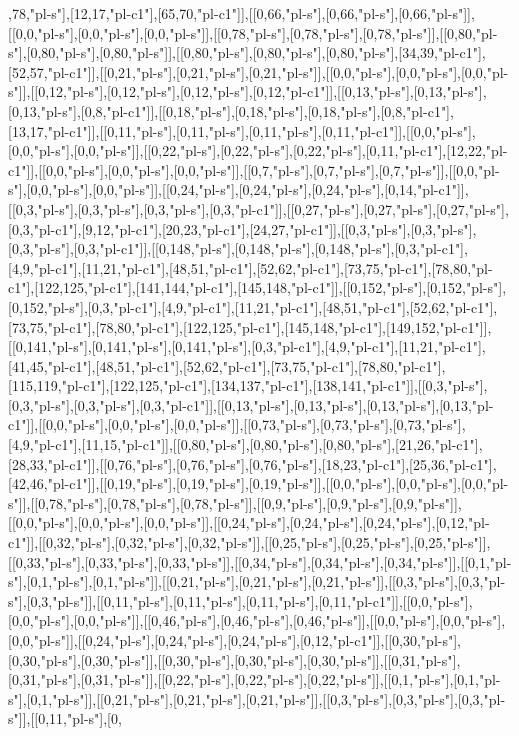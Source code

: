 ,78,"pl-s"],[12,17,"pl-c1"],[65,70,"pl-c1"]],[[0,66,"pl-s"],[0,66,"pl-s"],[0,66,"pl-s"]],[[0,0,"pl-s"],[0,0,"pl-s"],[0,0,"pl-s"]],[[0,78,"pl-s"],[0,78,"pl-s"],[0,78,"pl-s"]],[[0,80,"pl-s"],[0,80,"pl-s"],[0,80,"pl-s"]],[[0,80,"pl-s"],[0,80,"pl-s"],[0,80,"pl-s"],[34,39,"pl-c1"],[52,57,"pl-c1"]],[[0,21,"pl-s"],[0,21,"pl-s"],[0,21,"pl-s"]],[[0,0,"pl-s"],[0,0,"pl-s"],[0,0,"pl-s"]],[[0,12,"pl-s"],[0,12,"pl-s"],[0,12,"pl-s"],[0,12,"pl-c1"]],[[0,13,"pl-s"],[0,13,"pl-s"],[0,13,"pl-s"],[0,8,"pl-c1"]],[[0,18,"pl-s"],[0,18,"pl-s"],[0,18,"pl-s"],[0,8,"pl-c1"],[13,17,"pl-c1"]],[[0,11,"pl-s"],[0,11,"pl-s"],[0,11,"pl-s"],[0,11,"pl-c1"]],[[0,0,"pl-s"],[0,0,"pl-s"],[0,0,"pl-s"]],[[0,22,"pl-s"],[0,22,"pl-s"],[0,22,"pl-s"],[0,11,"pl-c1"],[12,22,"pl-c1"]],[[0,0,"pl-s"],[0,0,"pl-s"],[0,0,"pl-s"]],[[0,7,"pl-s"],[0,7,"pl-s"],[0,7,"pl-s"]],[[0,0,"pl-s"],[0,0,"pl-s"],[0,0,"pl-s"]],[[0,24,"pl-s"],[0,24,"pl-s"],[0,24,"pl-s"],[0,14,"pl-c1"]],[[0,3,"pl-s"],[0,3,"pl-s"],[0,3,"pl-s"],[0,3,"pl-c1"]],[[0,27,"pl-s"],[0,27,"pl-s"],[0,27,"pl-s"],[0,3,"pl-c1"],[9,12,"pl-c1"],[20,23,"pl-c1"],[24,27,"pl-c1"]],[[0,3,"pl-s"],[0,3,"pl-s"],[0,3,"pl-s"],[0,3,"pl-c1"]],[[0,148,"pl-s"],[0,148,"pl-s"],[0,148,"pl-s"],[0,3,"pl-c1"],[4,9,"pl-c1"],[11,21,"pl-c1"],[48,51,"pl-c1"],[52,62,"pl-c1"],[73,75,"pl-c1"],[78,80,"pl-c1"],[122,125,"pl-c1"],[141,144,"pl-c1"],[145,148,"pl-c1"]],[[0,152,"pl-s"],[0,152,"pl-s"],[0,152,"pl-s"],[0,3,"pl-c1"],[4,9,"pl-c1"],[11,21,"pl-c1"],[48,51,"pl-c1"],[52,62,"pl-c1"],[73,75,"pl-c1"],[78,80,"pl-c1"],[122,125,"pl-c1"],[145,148,"pl-c1"],[149,152,"pl-c1"]],[[0,141,"pl-s"],[0,141,"pl-s"],[0,141,"pl-s"],[0,3,"pl-c1"],[4,9,"pl-c1"],[11,21,"pl-c1"],[41,45,"pl-c1"],[48,51,"pl-c1"],[52,62,"pl-c1"],[73,75,"pl-c1"],[78,80,"pl-c1"],[115,119,"pl-c1"],[122,125,"pl-c1"],[134,137,"pl-c1"],[138,141,"pl-c1"]],[[0,3,"pl-s"],[0,3,"pl-s"],[0,3,"pl-s"],[0,3,"pl-c1"]],[[0,13,"pl-s"],[0,13,"pl-s"],[0,13,"pl-s"],[0,13,"pl-c1"]],[[0,0,"pl-s"],[0,0,"pl-s"],[0,0,"pl-s"]],[[0,73,"pl-s"],[0,73,"pl-s"],[0,73,"pl-s"],[4,9,"pl-c1"],[11,15,"pl-c1"]],[[0,80,"pl-s"],[0,80,"pl-s"],[0,80,"pl-s"],[21,26,"pl-c1"],[28,33,"pl-c1"]],[[0,76,"pl-s"],[0,76,"pl-s"],[0,76,"pl-s"],[18,23,"pl-c1"],[25,36,"pl-c1"],[42,46,"pl-c1"]],[[0,19,"pl-s"],[0,19,"pl-s"],[0,19,"pl-s"]],[[0,0,"pl-s"],[0,0,"pl-s"],[0,0,"pl-s"]],[[0,78,"pl-s"],[0,78,"pl-s"],[0,78,"pl-s"]],[[0,9,"pl-s"],[0,9,"pl-s"],[0,9,"pl-s"]],[[0,0,"pl-s"],[0,0,"pl-s"],[0,0,"pl-s"]],[[0,24,"pl-s"],[0,24,"pl-s"],[0,24,"pl-s"],[0,12,"pl-c1"]],[[0,32,"pl-s"],[0,32,"pl-s"],[0,32,"pl-s"]],[[0,25,"pl-s"],[0,25,"pl-s"],[0,25,"pl-s"]],[[0,33,"pl-s"],[0,33,"pl-s"],[0,33,"pl-s"]],[[0,34,"pl-s"],[0,34,"pl-s"],[0,34,"pl-s"]],[[0,1,"pl-s"],[0,1,"pl-s"],[0,1,"pl-s"]],[[0,21,"pl-s"],[0,21,"pl-s"],[0,21,"pl-s"]],[[0,3,"pl-s"],[0,3,"pl-s"],[0,3,"pl-s"]],[[0,11,"pl-s"],[0,11,"pl-s"],[0,11,"pl-s"],[0,11,"pl-c1"]],[[0,0,"pl-s"],[0,0,"pl-s"],[0,0,"pl-s"]],[[0,46,"pl-s"],[0,46,"pl-s"],[0,46,"pl-s"]],[[0,0,"pl-s"],[0,0,"pl-s"],[0,0,"pl-s"]],[[0,24,"pl-s"],[0,24,"pl-s"],[0,24,"pl-s"],[0,12,"pl-c1"]],[[0,30,"pl-s"],[0,30,"pl-s"],[0,30,"pl-s"]],[[0,30,"pl-s"],[0,30,"pl-s"],[0,30,"pl-s"]],[[0,31,"pl-s"],[0,31,"pl-s"],[0,31,"pl-s"]],[[0,22,"pl-s"],[0,22,"pl-s"],[0,22,"pl-s"]],[[0,1,"pl-s"],[0,1,"pl-s"],[0,1,"pl-s"]],[[0,21,"pl-s"],[0,21,"pl-s"],[0,21,"pl-s"]],[[0,3,"pl-s"],[0,3,"pl-s"],[0,3,"pl-s"]],[[0,11,"pl-s"],[0,